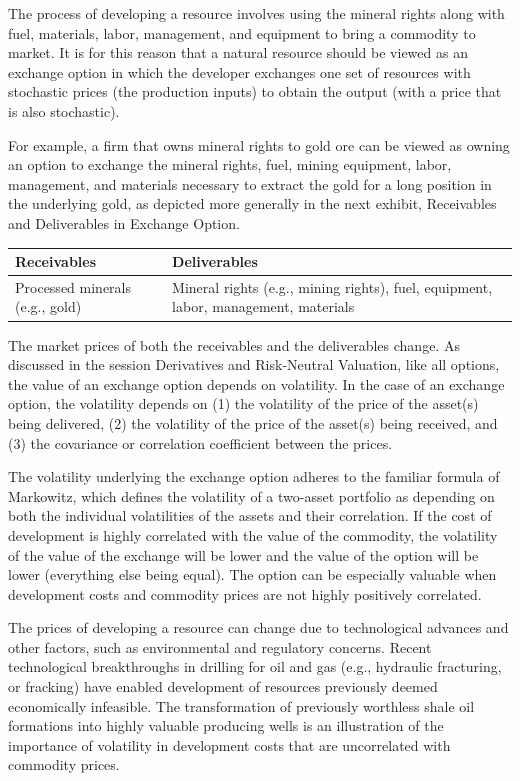 \documentclass[11pt]{article}
\begin{document}
The process of developing a resource involves using the mineral rights along with fuel, materials, labor, management, and equipment to bring a commodity to market. It is for this reason that a natural resource should be viewed as an exchange option in which the developer exchanges one set of resources with stochastic prices (the production inputs) to obtain the output (with a price that is also stochastic).

For example, a firm that owns mineral rights to gold ore can be viewed as owning an option to exchange the mineral rights, fuel, mining equipment, labor, management, and materials necessary to extract the gold for a long position in the underlying gold, as depicted more generally in the next exhibit, Receivables and Deliverables in Exchange Option.

\begin{center}
\begin{tabular}{|ll|}
\hline
Receivables & Deliverables \\
\hline
Processed minerals (e.g., gold) & Mineral rights (e.g., mining rights), fuel, equipment, labor, management, materials \\
\hline
\end{tabular}
\end{center}

The market prices of both the receivables and the deliverables change. As discussed in the session Derivatives and Risk-Neutral Valuation, like all options, the value of an exchange option depends on volatility. In the case of an exchange option, the volatility depends on (1) the volatility of the price of the asset(s) being delivered, (2) the volatility of the price of the asset(s) being received, and (3) the covariance or correlation coefficient between the prices.

The volatility underlying the exchange option adheres to the familiar formula of Markowitz, which defines the volatility of a two-asset portfolio as depending on both the individual volatilities of the assets and their correlation. If the cost of development is highly correlated with the value of the commodity, the volatility of the value of the exchange will be lower and the value of the option will be lower (everything else being equal). The option can be especially valuable when development costs and commodity prices are not highly positively correlated.

The prices of developing a resource can change due to technological advances and other factors, such as environmental and regulatory concerns. Recent technological breakthroughs in drilling for oil and gas (e.g., hydraulic fracturing, or fracking) have enabled development of resources previously deemed economically infeasible. The transformation of previously worthless shale oil formations into highly valuable producing wells is an illustration of the importance of volatility in development costs that are uncorrelated with commodity prices.
\end{document}

